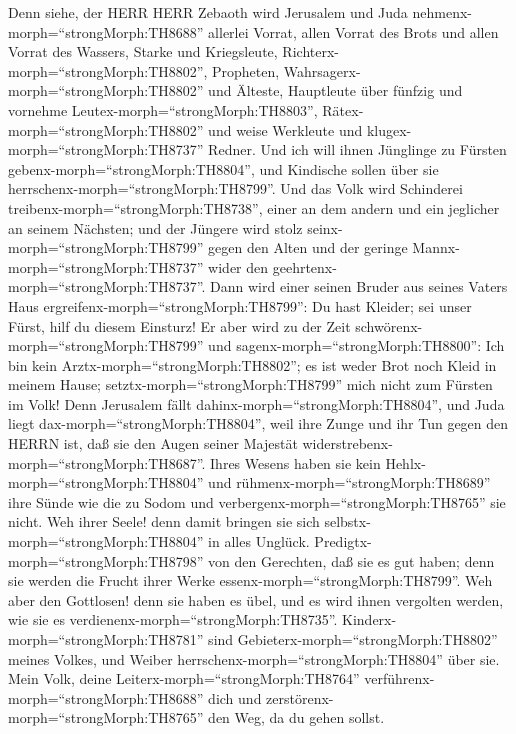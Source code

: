  Denn siehe, der HERR HERR Zebaoth wird Jerusalem und Juda
nehmenx-morph=``strongMorph:TH8688'' allerlei Vorrat, allen Vorrat des
Brots und allen Vorrat des Wassers,  Starke und Kriegsleute,
Richterx-morph=``strongMorph:TH8802'', Propheten,
Wahrsagerx-morph=``strongMorph:TH8802'' und Älteste, 
Hauptleute über fünfzig und vornehme
Leutex-morph=``strongMorph:TH8803'', Rätex-morph=``strongMorph:TH8802''
und weise Werkleute und klugex-morph=``strongMorph:TH8737'' Redner.
 Und ich will ihnen Jünglinge zu Fürsten
gebenx-morph=``strongMorph:TH8804'', und Kindische sollen über sie
herrschenx-morph=``strongMorph:TH8799''.  Und das Volk wird
Schinderei treibenx-morph=``strongMorph:TH8738'', einer an dem andern
und ein jeglicher an seinem Nächsten; und der Jüngere wird stolz
seinx-morph=``strongMorph:TH8799'' gegen den Alten und der geringe
Mannx-morph=``strongMorph:TH8737'' wider den
geehrtenx-morph=``strongMorph:TH8737''.  Dann wird einer
seinen Bruder aus seines Vaters Haus
ergreifenx-morph=``strongMorph:TH8799'': Du hast Kleider; sei unser
Fürst, hilf du diesem Einsturz!  Er aber wird zu der Zeit
schwörenx-morph=``strongMorph:TH8799'' und
sagenx-morph=``strongMorph:TH8800'': Ich bin kein
Arztx-morph=``strongMorph:TH8802''; es ist weder Brot noch Kleid in
meinem Hause; setztx-morph=``strongMorph:TH8799'' mich nicht zum Fürsten
im Volk!  Denn Jerusalem fällt
dahinx-morph=``strongMorph:TH8804'', und Juda liegt
dax-morph=``strongMorph:TH8804'', weil ihre Zunge und ihr Tun gegen den
HERRN ist, daß sie den Augen seiner Majestät
widerstrebenx-morph=``strongMorph:TH8687''.  Ihres Wesens
haben sie kein Hehlx-morph=``strongMorph:TH8804'' und
rühmenx-morph=``strongMorph:TH8689'' ihre Sünde wie die zu Sodom und
verbergenx-morph=``strongMorph:TH8765'' sie nicht. Weh ihrer Seele! denn
damit bringen sie sich selbstx-morph=``strongMorph:TH8804'' in alles
Unglück.  Predigtx-morph=``strongMorph:TH8798'' von den
Gerechten, daß sie es gut haben; denn sie werden die Frucht ihrer Werke
essenx-morph=``strongMorph:TH8799''.  Weh aber den
Gottlosen! denn sie haben es übel, und es wird ihnen vergolten werden,
wie sie es verdienenx-morph=``strongMorph:TH8735''. 
Kinderx-morph=``strongMorph:TH8781'' sind
Gebieterx-morph=``strongMorph:TH8802'' meines Volkes, und Weiber
herrschenx-morph=``strongMorph:TH8804'' über sie. Mein Volk, deine
Leiterx-morph=``strongMorph:TH8764''
verführenx-morph=``strongMorph:TH8688'' dich und
zerstörenx-morph=``strongMorph:TH8765'' den Weg, da du gehen sollst.
